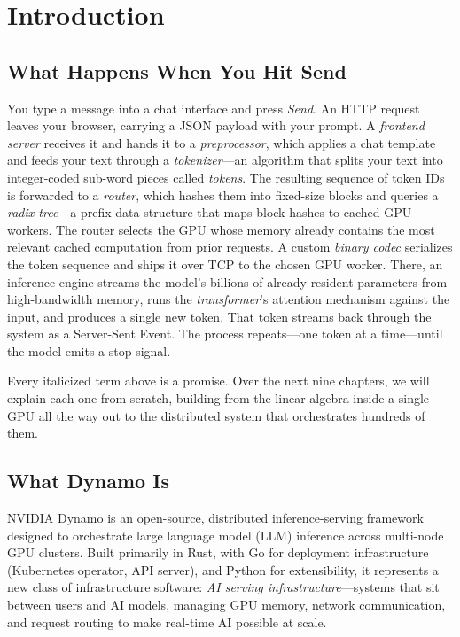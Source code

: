 \chapter{Introduction}

\section{What Happens When You Hit Send}

You type a message into a chat interface and press \emph{Send}. An HTTP request leaves your browser, carrying a JSON payload with your prompt. A \emph{frontend server} receives it and hands it to a \emph{preprocessor}, which applies a chat template and feeds your text through a \emph{tokenizer}---an algorithm that splits your text into integer-coded sub-word pieces called \emph{tokens}. The resulting sequence of token IDs is forwarded to a \emph{router}, which hashes them into fixed-size blocks and queries a \emph{radix tree}---a prefix data structure that maps block hashes to cached GPU workers. The router selects the GPU whose memory already contains the most relevant cached computation from prior requests. A custom \emph{binary codec} serializes the token sequence and ships it over TCP to the chosen GPU worker. There, an inference engine streams the model's billions of already-resident parameters from high-bandwidth memory, runs the \emph{transformer}'s attention mechanism against the input, and produces a single new token. That token streams back through the system as a Server-Sent Event. The process repeats---one token at a time---until the model emits a stop signal.

Every italicized term above is a promise. Over the next nine chapters, we will explain each one from scratch, building from the linear algebra inside a single GPU all the way out to the distributed system that orchestrates hundreds of them.

\section{What Dynamo Is}

NVIDIA Dynamo is an open-source, distributed inference-serving framework designed to orchestrate large language model (LLM) inference across multi-node GPU clusters. Built primarily in Rust, with Go for deployment infrastructure (Kubernetes operator, API server), and Python for extensibility, it represents a new class of infrastructure software: \emph{AI serving infrastructure}---systems that sit between users and AI models, managing GPU memory, network communication, and request routing to make real-time AI possible at scale.

